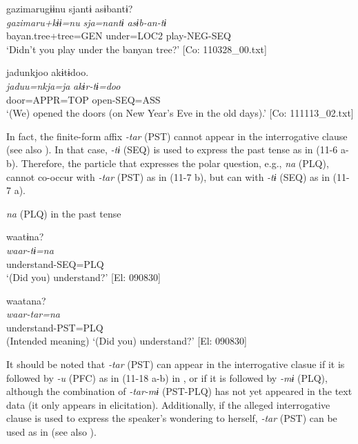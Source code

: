   \ex  
      \glll    gazimarugɨɨnu  sjantɨ  asɨbantɨ?\\
      \textit{gazimaru+kɨɨ=nu}  \textit{sja=nantɨ}  \textit{asɨb-an-tɨ}\\
      bayan.tree+tree=GEN  under=LOC2  play-NEG-SEQ\\
      \glt       ‘Didn’t you play under the banyan tree?’ [Co: 110328\_00.txt]

  \ex  
      \glll    jadunkjoo  akɨtɨdoo.\\
      \textit{jaduu=nkja=ja}  \textit{akɨr-tɨ=doo}\\
      door=APPR=TOP  open-SEQ=ASS\\
      \glt       ‘(We) opened the doors (on New Year’s Eve in the old days).’ [Co: 111113\_02.txt]
\z
\z

  In fact, the finite-form affix \textit{{}-tar} (PST) cannot appear in the interrogative clause (see also ). In that case, \textit{{}-tɨ} (SEQ) is used to express the past tense as in (11-6 a-b). Therefore, the particle that expresses the polar question, e.g., \textit{na} (PLQ), cannot co-occur with \textit{{}-tar} (PST) as in (11-7 b), but can with \textit{{}-tɨ} (SEQ) as in (11-7 a).

\ea\label{ex:11-7}  \textit{na} (PLQ) in the past tense

  \ea  
      \glll    waatɨna?\\
      \textit{waar-tɨ=na}\\
      understand-SEQ=PLQ\\
      \glt       ‘(Did you) understand?’ [El: 090830]

  \ex  
      \glll    *waatana?\\
       \textit{waar-tar=na}\\
      understand-PST=PLQ\\
      \glt       (Intended meaning) ‘(Did you) understand?’ [El: 090830]
\z
\z

  It should be noted that \textit{{}-tar} (PST) can appear in the interrogative clasue if it is followed by \textit{{}-u} (PFC) as in (11-18 a-b) in , or if it is followed by \textit{{}-mɨ} (PLQ), although the combination of \textit{{}-tar-mɨ} (PST-PLQ) has not yet appeared in the text data (it only appears in elicitation). Additionally, if the alleged interrogative clause is used to express the speaker’s wondering to herself, \textit{{}-tar} (PST) can be used as in  (see also ).

